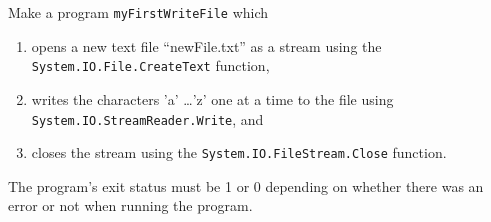 Make a program \lstinline{myFirstWriteFile} which
\begin{enumerate}
\item opens a new text file ``newFile.txt'' as a stream using the
  \lstinline{System.IO.File.CreateText} function,
\item writes the characters 'a' \dots 'z' one at a time to the file using
  \lstinline{System.IO.StreamReader.Write}, and
\item closes the stream using the \lstinline{System.IO.FileStream.Close}
  function.
\end{enumerate}
The program's exit status must be 1 or 0 depending on whether there
was an error or not when running the program.
